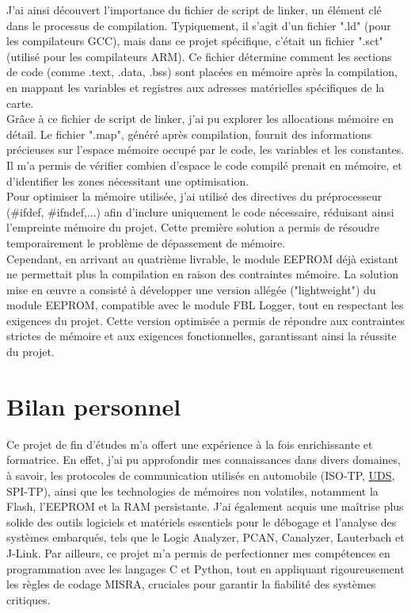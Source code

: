 \documentclass[a4paper, 12pt]{report}
\begin{document}
J'ai ainsi découvert l'importance du fichier de script de linker, un élément clé dans le processus de compilation. Typiquement, il s'agit d'un fichier ".ld" (pour les compilateurs GCC), mais dans ce projet spécifique, c'était un fichier ".sct" (utilisé pour les compilateurs ARM). Ce fichier détermine comment les sections de code (comme .text, .data, .bss) sont placées en mémoire après la compilation, en mappant les variables et registres aux adresses matérielles spécifiques de la carte.\\

Grâce à ce fichier de script de linker, j'ai pu explorer les allocations mémoire en détail. Le fichier ".map", généré après compilation, fournit des informations précieuses sur l'espace mémoire occupé par le code, les variables et les constantes. Il m'a permis de vérifier combien d'espace le code compilé prenait en mémoire, et d'identifier les zones nécessitant une optimisation.\\

Pour optimiser la mémoire utilisée, j'ai utilisé des directives du préprocesseur (\#ifdef, \#ifndef,...) afin d'inclure uniquement le code nécessaire, réduisant ainsi l'empreinte mémoire du projet. Cette première solution a permis de résoudre temporairement le problème de dépassement de mémoire.\\

Cependant, en arrivant au quatrième livrable, le module EEPROM déjà existant ne permettait plus la compilation en raison des contraintes mémoire. La solution mise en œuvre a consisté à développer une version allégée ("lightweight") du module EEPROM, compatible avec le module FBL Logger, tout en respectant les exigences du projet. Cette version optimisée a permis de répondre aux contraintes strictes de mémoire et aux exigences fonctionnelles, garantissant ainsi la réussite du projet.

\section{Bilan personnel}\label{sec:bilanPerso}
Ce projet de fin d'études m'a offert une expérience à la fois enrichissante et formatrice. En effet, j’ai pu approfondir mes connaissances dans divers domaines, à savoir, les protocoles de communication utilisés en automobile (ISO-TP, \hyperref[subsec:uds]{UDS}, SPI-TP), ainsi que les technologies de mémoires non volatiles, notamment la Flash, l'EEPROM et la RAM persistante. J'ai également acquis une maîtrise plus solide des outils logiciels et matériels essentiels pour le débogage et l'analyse des systèmes embarqués, tels que le Logic Analyzer, PCAN, Canalyzer, Lauterbach et J-Link. Par ailleurs, ce projet m'a permis de perfectionner mes compétences en programmation avec les langages C et Python, tout en appliquant rigoureusement les règles de codage MISRA, cruciales pour garantir la fiabilité des systèmes critiques.\\
\end{document}
